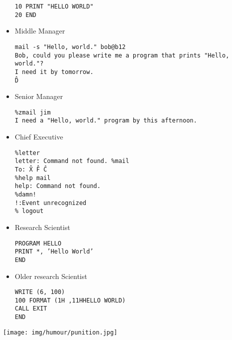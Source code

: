 \begin{itemize}
\texttt{10 PRINT "HELLO WORLD"\\
20 END}

	\item Middle Manager

\texttt{mail -s "Hello, world." bob@b12\\
Bob, could you please write me a program that prints "Hello, world."?\\
I need it by tomorrow.\\
\^D\\}

	\item Senior Manager

\texttt{\%zmail jim\\
I need a "Hello, world." program by this afternoon.}

	\item Chief Executive

\texttt{\%letter\\
letter: Command not found.
\%mail\\
To: \^X \^F \^C\\
\%help mail\\
help: Command not found.\\
\%damn!\\
!:Event unrecognized\\
\% logout\\}

	\item Research Scientist

\texttt{PROGRAM HELLO\\
PRINT *, 'Hello World'\\
END}

	\item Older research Scientist

\texttt{WRITE (6, 100)\\
100 FORMAT (1H ,11HHELLO WORLD)\\
CALL EXIT\\
END}

\end{itemize}
\begin{center}\underline{\hspace{5 cm}}\end{center}	

	\begin{center}
	\texttt{[image: img/humour/punition.jpg]}
	\end{center}
	
\begin{center}\underline{\hspace{5 cm}}\end{center}

